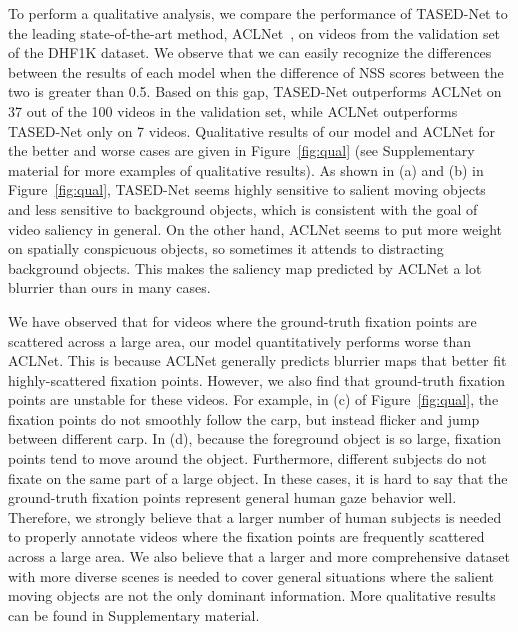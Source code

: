 \documentclass[10pt,twocolumn,letterpaper]{article}
\newcommand{\modelname}{TASED-Net}
\begin{document}
\begin{table}[!t]
To perform a qualitative analysis, we compare the performance of \modelname{} to the leading state-of-the-art method, ACLNet~\cite{wang2018revisiting}, on videos from the validation set of the DHF1K dataset. We observe that we can easily recognize the differences between the results of each model when the difference of NSS scores between the two is greater than 0.5. Based on this gap, \modelname{} outperforms ACLNet on 37 out of the 100 videos in the validation set, while ACLNet outperforms \modelname{} only on 7 videos. Qualitative results of our model and ACLNet for the better and worse cases are given in Figure~\ref{fig:qual} (see Supplementary material for more examples of qualitative results). As shown in (a) and (b) in Figure~\ref{fig:qual}, \modelname{} seems highly sensitive to salient moving objects and less sensitive to background objects, which is consistent with the goal of video saliency in general. On the other hand, ACLNet seems to put more weight on spatially conspicuous objects, so sometimes it attends to distracting background objects. This makes the saliency map predicted by ACLNet a lot blurrier than ours in many cases.

We have observed that for videos where the ground-truth fixation points are scattered across a large area, our model quantitatively performs worse than ACLNet. This is because ACLNet generally predicts blurrier maps that better fit highly-scattered fixation points. However, we also find that ground-truth fixation points are unstable for these videos. For example, in (c) of Figure~\ref{fig:qual}, the fixation points do not smoothly follow the carp, but instead flicker and jump between different carp. In (d), because the foreground object is so large, fixation points tend to move around the object. Furthermore, different subjects do not fixate on the same part of a large object. In these cases, it is hard to say that the ground-truth fixation points represent general human gaze behavior well. Therefore, we strongly believe that a larger number of human subjects is needed to properly annotate videos where the fixation points are frequently scattered across a large area. We also believe that a larger and more comprehensive dataset with more diverse scenes is needed to cover general situations where the salient moving objects are not the only dominant information. More qualitative results can be found in Supplementary material.



\end{table}
\end{document}
